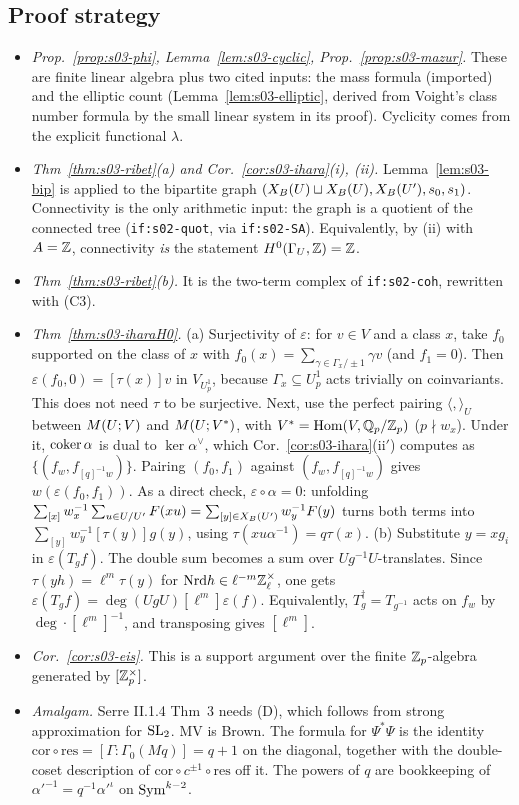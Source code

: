 \subsection{Proof strategy}
\begin{itemize}
\item \emph{Prop.~\ref{prop:s03-phi}, Lemma~\ref{lem:s03-cyclic}, Prop.~\ref{prop:s03-mazur}.} These are finite linear algebra plus two
  cited inputs: the mass formula (imported) and the elliptic count (Lemma~\ref{lem:s03-elliptic}, derived from Voight's class number
  formula by the small linear system in its proof). Cyclicity comes from the explicit functional $\lambda$.
\item \emph{Thm~\ref{thm:s03-ribet}(a) and Cor.~\ref{cor:s03-ihara}(i), (ii).} Lemma~\ref{lem:s03-bip} is applied to the bipartite
  graph $(X_B(U)\sqcup X_B(U),X_B(U'),s_0,s_1)$. Connectivity is the only arithmetic input: the graph is a quotient of the connected tree
  (\texttt{if:s02-quot}, via \texttt{if:s02-SA}). Equivalently, by (ii) with $A=\mathbb{Z}$, connectivity \emph{is} the statement
  $H^0(\Gamma_U,\mathbb{Z})=\mathbb{Z}$.
\item \emph{Thm~\ref{thm:s03-ribet}(b).} It is the two-term complex of \texttt{if:s02-coh}, rewritten with (C3).
\item \emph{Thm~\ref{thm:s03-iharaH0}.} (a) Surjectivity of $\varepsilon$: for $v\in V$ and a class $x$, take $f_0$ supported on the class of $x$ with $f_0(x)=\sum_{\gamma\in\Gamma_x/\pm1}\gamma v$ (and $f_1=0$). Then $\varepsilon(f_0,0)=[\tau(x)]v$ in $V_{U^1_p}$, because $\Gamma_x\subseteq U^1_p$ acts trivially on coinvariants. This does not need $\tau$ to be surjective. Next, use the perfect pairing $\langle,\rangle_U$ between $M(U;V)$ and
  $M(U;V^*)$, with $V^*=\operatorname{Hom}(V,\mathbb{Q}_p/\mathbb{Z}_p)$ ($p\nmid w_x$). Under it, $\operatorname{coker}\alpha$ is dual to $\ker\alpha^\vee$, which
  Cor.~\ref{cor:s03-ihara}(ii$'$) computes as $\{(f_w,f_{[q]^{-1}w})\}$. Pairing $(f_0,f_1)$ against $(f_w,f_{[q]^{-1}w})$ gives
  $w(\varepsilon(f_0,f_1))$. As a direct check, $\varepsilon\circ\alpha=0$: unfolding
  $\sum_{[x]}w_x^{-1}\sum_{u\in U/U'}F(xu)=\sum_{[y]\in X_B(U')}w_y^{-1}F(y)$ turns both terms into
  $\sum_{[y]}w_y^{-1}[\tau(y)]g(y)$, using $\tau(xu\alpha^{-1})=q\tau(x)$. (b) Substitute $y=xg_i$ in $\varepsilon(T_gf)$. The
  double sum becomes a sum over $Ug^{-1}U$-translates. Since $\tau(yh)=\ell^{m}\tau(y)$ for $\mathrm{Nrd} h\in\ell^{-m}\mathbb{Z}_\ell^\times$, one gets
  $\varepsilon(T_gf)=\deg(UgU)[\ell^m]\varepsilon(f)$. Equivalently, $T_g^\dagger=T_{g^{-1}}$ acts on $f_w$ by $\deg\cdot[\ell^m]^{-1}$,
  and transposing gives $[\ell^m]$.
\item \emph{Cor.~\ref{cor:s03-eis}.} This is a support argument over the finite $\mathbb{Z}_p$-algebra generated by $[\mathbb{Z}_p^\times]$.
\item \emph{Amalgam.} Serre II.1.4 Thm~3 needs (D), which follows from strong approximation for $\mathrm{SL}_2$. MV is Brown. The formula for
  $\Psi^*\Psi$ is the identity $\mathrm{cor}\circ\mathrm{res}=[\Gamma:\Gamma_0(Mq)]=q+1$ on the diagonal, together with the
  double-coset description of $\mathrm{cor}\circ c^{\pm1}\circ\mathrm{res}$ off it. The powers of $q$ are bookkeeping of
  $\alpha'^{-1}=q^{-1}\alpha'^\iota$ on $\mathrm{Sym}^{k-2}$.
\end{itemize}

